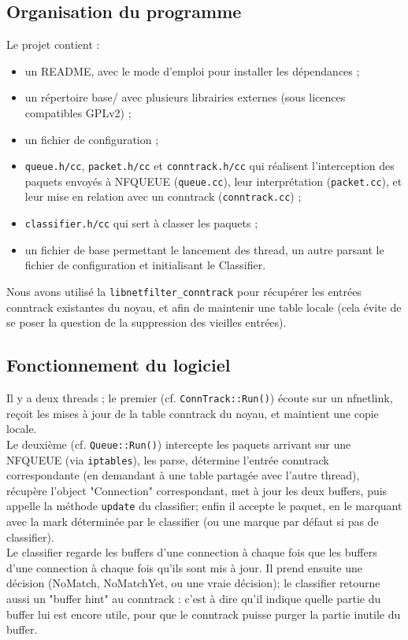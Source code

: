 \subsection*{Organisation du programme}
Le projet contient :
\begin{itemize}
\item un README, avec le mode d'emploi pour installer les dépendances ;
\item un répertoire base/ avec plusieurs librairies externes (sous
licences compatibles GPLv2) ;
\item un fichier de configuration ;
\item \verb+queue.h/cc+, \verb+packet.h/cc+ et \verb+conntrack.h/cc+ qui réalisent l'interception des paquets envoyés à NFQUEUE (\verb+queue.cc+), leur
interprétation (\verb+packet.cc+), et leur mise en relation avec un conntrack
(\verb+conntrack.cc+) ;
\item \verb+classifier.h/cc+ qui sert à classer les paquets ;
\item un fichier de base permettant le lancement des thread, un autre parsant le fichier de configuration et initialisant le Classifier.
\end{itemize}

Nous avons utilisé la \verb+libnetfilter_conntrack+ pour
récupérer les entrées conntrack existantes du noyau, et afin de maintenir une table locale (cela évite de se poser la question de
la suppression des vieilles entrées).

\subsection*{Fonctionnement du logiciel}
Il y a deux threads ; le premier (cf. \verb+ConnTrack::Run()+) écoute sur un
nfnetlink, reçoit les mises à jour de la table conntrack du noyau, et
maintient une copie locale.\\

Le deuxième (cf. \verb+Queue::Run()+) intercepte les paquets arrivant sur une
NFQUEUE (via \verb+iptables+), les parse, détermine l'entrée conntrack
correspondante (en demandant à une table partagée avec l'autre
thread), récupère l'object "Connection" correspondant, met à jour les
deux buffers, puis appelle la méthode \verb+update+ du classifier; enfin il
accepte le paquet, en le marquant avec la mark déterminée par le
classifier (ou une marque par défaut si pas de classifier).\\

Le classifier regarde les buffers d'une connection à chaque fois que les buffers d'une connection à chaque fois qu'ils sont mis à jour. Il prend ensuite une décision (NoMatch, NoMatchYet, ou une vraie décision); le classifier retourne aussi un "buffer hint" au conntrack : c'est à dire qu'il indique quelle
partie du buffer lui est encore utile, pour que le conntrack puisse
purger la partie inutile du buffer.\\

